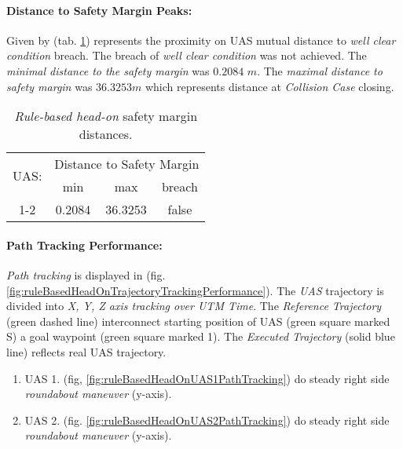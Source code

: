 \paragraph{Distance to Safety Margin Peaks:} Given by (tab. \ref{tab:testCaseRuleBasedHeadOnSafetyMarginDistances}) represents the proximity on UAS mutual distance to \emph{well clear condition} breach. The breach of \emph{well clear condition} was not achieved. The \emph{minimal distance to the safety margin} was $0.2084$ $m$. The \emph{maximal distance to safety margin} was $36.3253 m$ which represents distance at \emph{Collision Case} closing. 

\begin{table}[H]
    \centering
    \begin{tabular}{c||c|c|c}
        \multirow{2}{*}{UAS:} & \multicolumn{3}{c}{Distance to Safety Margin} \\ \cline{2-4} 
                  & min          & max         & breach         \\ \hline\hline
            1-2   & 0.2084       & 36.3253     & false          \\ 
    \end{tabular}
    \caption{\emph{Rule-based head-on} safety margin distances.}
    \label{tab:testCaseRuleBasedHeadOnSafetyMarginDistances}
\end{table}

\paragraph{Path Tracking Performance:} \emph{Path tracking} is displayed in (fig. \ref{fig:ruleBasedHeadOnTrajectoryTrackingPerformance}). The \emph{UAS} trajectory is divided into \emph{X, Y, Z axis tracking over UTM Time}. The \emph{Reference Trajectory} (green dashed line) interconnect starting position of UAS (green square marked S) a goal waypoint (green square marked 1). The \emph{Executed Trajectory} (solid blue line) reflects real UAS trajectory. 

\begin{enumerate}
    \item UAS 1. (fig, \ref{fig:ruleBasedHeadOnUAS1PathTracking}) do steady right side \emph{roundabout maneuver} (y-axis).
    
    \item UAS 2. (fig. \ref{fig:ruleBasedHeadOnUAS2PathTracking}) do steady right side \emph{roundabout maneuver} (y-axis).
\end{enumerate}

